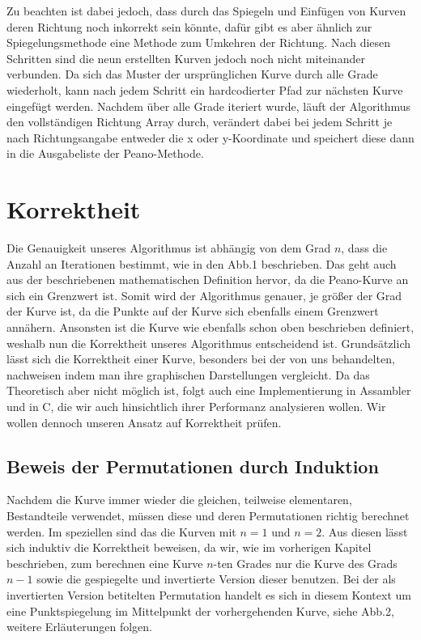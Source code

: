\documentclass[course=asp]{aspdoc}
\begin{document}
Zu beachten ist dabei jedoch, dass durch das Spiegeln und Einf\"ugen von Kurven deren Richtung noch inkorrekt sein k\"onnte, daf\"ur gibt es aber \"ahnlich zur Spiegelungsmethode eine Methode zum Umkehren der Richtung. Nach diesen Schritten sind die neun erstellten Kurven jedoch noch nicht miteinander verbunden. Da sich das Muster der urspr\"unglichen Kurve durch alle Grade wiederholt, kann nach jedem Schritt ein hardcodierter Pfad zur n\"achsten Kurve eingef\"ugt werden.
Nachdem \"uber alle Grade iteriert wurde, l\"auft der Algorithmus den vollst\"andigen Richtung Array durch, ver\"andert dabei bei jedem Schritt je nach Richtungsangabe entweder die x oder y-Koordinate und speichert diese dann in die Ausgabeliste der Peano-Methode.

\newpage

\section{Korrektheit} %


Die Genauigkeit unseres Algorithmus ist abh\"angig von dem Grad $n$, dass die Anzahl an Iterationen bestimmt, wie in den Abb.1 beschrieben. Das geht auch aus der beschriebenen mathematischen Definition hervor, da die Peano-Kurve an sich ein Grenzwert ist. Somit wird der Algorithmus genauer, je gr\"oßer der Grad der Kurve ist, da die Punkte auf der Kurve sich ebenfalls einem Grenzwert ann\"ahern. Ansonsten ist die Kurve wie ebenfalls schon oben beschrieben definiert, weshalb nun die Korrektheit unseres Algorithmus entscheidend ist.
Grunds\"atzlich l\"asst sich die Korrektheit einer Kurve, besonders bei der von uns behandelten, nachweisen indem man ihre graphischen Darstellungen vergleicht. Da das Theoretisch aber nicht m\"oglich ist, folgt auch eine Implementierung in Assambler und in C, die wir auch hinsichtlich ihrer Performanz analysieren wollen.
Wir wollen dennoch unseren Ansatz auf Korrektheit pr\"ufen.

\subsection{Beweis der Permutationen durch Induktion}
Nachdem die Kurve immer wieder die gleichen, teilweise elementaren, Bestandteile verwendet, m\"ussen diese und deren Permutationen richtig berechnet werden. Im speziellen sind das die Kurven mit $n = 1$ und $n = 2$. Aus diesen l\"asst sich induktiv die Korrektheit beweisen, da wir, wie im vorherigen Kapitel beschrieben, zum berechnen eine Kurve $n$-ten Grades nur die Kurve des Grads $n - 1$ sowie die gespiegelte und invertierte Version dieser benutzen. Bei der als invertierten Version betitelten Permutation handelt es sich in diesem Kontext um eine Punktspiegelung im Mittelpunkt der vorhergehenden Kurve, siehe Abb.2, weitere Erl\"auterungen folgen.	%
\end{document}
